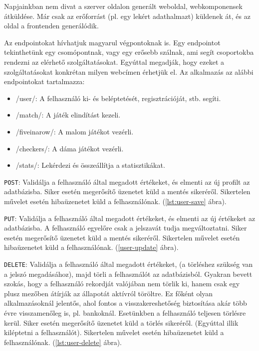 Napjainkban nem divat a szerver oldalon generált weboldal, webkomponensek átküldése. Már csak az erőforrást (pl. egy lekért adathalmazt) küldenek át, és az oldal a frontenden generálódik.


Az endpointokat hívhatjuk magyarul végpontoknak is. Egy endpointot tekinthetünk egy csomópontnak, vagy egy erősebb szálnak, ami segít csoportokba rendezni az elérhető szolgáltatásokat. Egyúttal megadják, hogy ezeket a szolgáltatásokat konkrétan milyen webcímen érhetjük el. Az alkalmazás az alábbi endpointokat tartalmazza:
\begin{itemize}
	\item /user/: A felhasználó ki- és beléptetését, regisztrációját, stb. segíti.
	\item /match/: A játék elindítást kezeli.
	\item /fiveinarow/: A malom játékot vezérli.
	\item /checkers/: A dáma játékot vezérli.
	\item /stats/: Lekérdezi és összeállítja a statisztikákat.
\end{itemize}



\texttt{POST}: Validálja a felhasználó által megadott értékeket, és elmenti az új profilt az adatbázisba.
Siker esetén megerősítő üzenetet küld a mentés sikeréről.
Sikertelen művelet esetén hibaüzenetet küld a felhasználónak. (\ref{lst:user-save} ábra).



\texttt{PUT}: Validálja a felhasználó által megadott értékeket, és elmenti az új értékeket az adatbázisba. A felhasználó egyelőre csak a jelszavát tudja megváltoztatni.
Siker esetén megerősítő üzenetet küld a mentés sikeréről.
Sikertelen művelet esetén hibaüzenetet küld a felhasználónak. (\ref{user-update} ábra).



\texttt{DELETE}: Validálja a felhasználó által megadott értékeket, (a törléshez szükség van a jelszó megadásához), majd törli a felhasználót az adatbázisból. Gyakran bevett szokás, hogy a felhasználó rekordját valójában nem törlik ki, hanem csak egy plusz mezőben átírják az állapotát aktívról töröltre. Ez főként olyan alkalmazásoknál jelentős, ahol fontos a visszakereshetőség biztosítása akár több évre visszamenőleg is, pl. bankoknál. Esetünkben a felhasználó teljesen törlésre kerül.
Siker esetén megerősítő üzenetet küld a törlés sikeréről. (Egyúttal illik kiléptetni a felhasználót).
Sikertelen művelet esetén hibaüzenetet küld a felhasználónak. (\ref{lst:user-delete} ábra).

